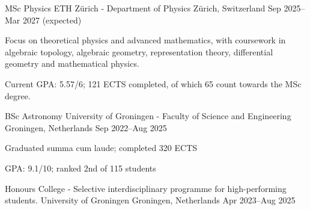 

\begin{cventries}

  \cventry
  {MSc Physics} %
  {ETH Zürich - Department of Physics} %
  {Zürich, Switzerland} %
  {Sep 2025--Mar 2027 (expected)} %
  {
    \begin{cvitems} %
      \item {Focus on theoretical physics and advanced mathematics, with coursework in algebraic topology, algebraic geometry, representation theory, differential geometry and mathematical physics.}
      \item {Current GPA: 5.57/6; 121 ECTS completed, of which 65 count towards the MSc degree.}
    \end{cvitems}
  }

  \cventry
  {BSc Astronomy} %
  {University of Groningen - Faculty of Science and Engineering} %
  {Groningen, Netherlands} %
  {Sep 2022--Aug 2025} %
  {
    \begin{cvitems} %
      \item {Graduated summa cum laude; completed 320 ECTS}
      \item {GPA: 9.1/10; ranked 2nd of 115 students}
    \end{cvitems}
  }

  \cventry
  {Honours College - Selective interdisciplinary programme for high-performing students.} %
  {University of Groningen} %
  {Groningen, Netherlands} %
  {Apr 2023--Aug 2025}
  {}

\end{cventries}
